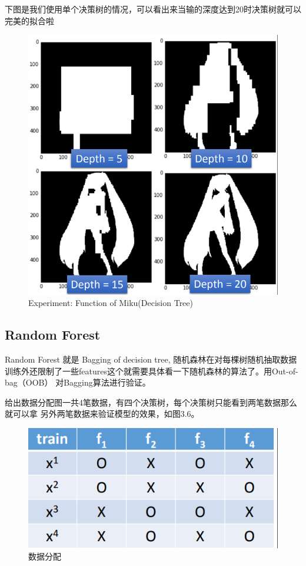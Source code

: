 下图是我们使用单个决策树的情况，可以看出来当输的深度达到20时决策树就可以完美的拟合啦
\begin{figure}[H]
    \centerline{\includegraphics[scale=0.3]{Part1/Chapter/images/experiment.png}}
    \caption{Experiment: Function of Miku(Decision Tree)}
\end{figure}

\subsection{Random Forest}

Random Forest 就是 Bagging of decision tree, 随机森林在对每棵树随机抽取数据
训练外还限制了一些features这个就需要具体看一下随机森林的算法了。用Out-of-bag（OOB）
对Bagging算法进行验证。

给出数据分配图一共4笔数据，有四个决策树，每个决策树只能看到两笔数据那么就可以拿
另外两笔数据来验证模型的效果，如图3.6。
\begin{figure}[H]
    \centerline{\includegraphics[scale=0.3]{Part1/Chapter/images/oob1.png}}
    \caption{数据分配}
\end{figure}

